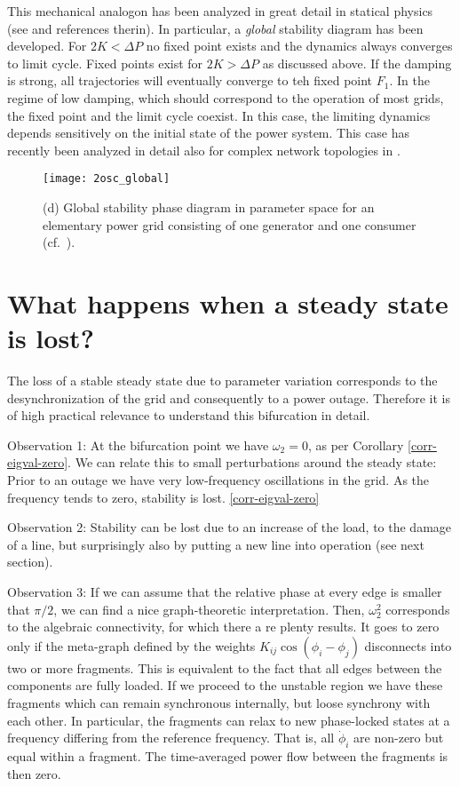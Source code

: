 \documentclass[10pt,aps,pra,twocolumn,superscriptaddress]{revtex4-1}
\begin{document}
This mechanical analogon has been analyzed in great detail in statical physics (see \cite{Risk96} and references therin).
In particular, a \emph{global} stability diagram has been developed. For $2K < \Delta P$ no fixed point exists and the
dynamics always converges to limit cycle. Fixed points exist for $2K > \Delta P$ as discussed above. If the damping is
strong, all trajectories will eventually converge to teh fixed point $F_1$. 
In the regime of low damping, which should correspond to the operation of most grids, the fixed point and the
limit cycle coexist. In this case, the limiting dynamics depends sensitively on the initial state of the power system.
This case has recently been analyzed in detail also for complex network topologies in \cite{Menc13,Menc14}.

\begin{figure}[tb]
\centering
\texttt{[image: 2osc\_global]}
\caption{\label{fig:osc-global}
(d) Global stability phase diagram in parameter space for
an elementary power grid consisting of one generator and
one consumer (cf.~\cite{Risk96}).
}
\end{figure}



\section{What happens when a steady state is lost?} 

The loss of a stable steady state due to parameter variation corresponds to the desynchronization of the grid and consequently to a power outage. Therefore it is of high practical relevance to understand this bifurcation in detail.

Observation 1: At the bifurcation point we have $\omega_2=0$, as per Corollary \ref{corr-eigval-zero}. We can relate this to small perturbations around the steady state: Prior to an outage we have very low-frequency oscillations in the grid. As the frequency tends to zero, stability is lost.
\ref{corr-eigval-zero}

Observation 2: Stability can be lost due to an increase of the load, to the damage of a line, but surprisingly also by putting a new line into operation (see next section). 

Observation 3: If we can assume that the relative phase at every edge is smaller that $\pi/2$, we can find a nice graph-theoretic interpretation. Then, $\omega_2^2$ corresponds to the algebraic connectivity, for which there a re plenty results. It goes to zero only if the meta-graph defined by the weights $K_{ij} \cos(\phi_i - \phi_j)$ disconnects into two or more fragments. This is equivalent to the fact that all edges between the components are fully loaded. If we proceed to the unstable region we have these fragments which can remain synchronous internally, but loose synchrony with each other. In particular, the fragments can relax to new phase-locked states at a frequency differing from the reference frequency. That is, all $\dot \phi_i$ are non-zero but equal within a fragment. The time-averaged power flow between the fragments is then zero.
\end{document}
